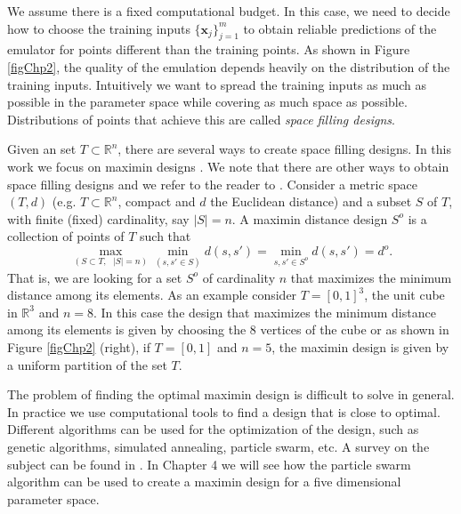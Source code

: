 \documentclass{sfuthesis}
\newcommand{\x}{\textbf{x}}
\begin{document}
We assume there is a fixed computational budget. In this case, we need to decide how
to choose the training inputs $\{\x_{j}\}_{j=1}^{m}$ to obtain reliable predictions 
of the emulator for points
different than the training points. As shown in Figure \ref{figChp2}, the quality
of the emulation depends heavily on the distribution of the training inputs. 
Intuitively we want to spread the training inputs as much as possible in the
parameter space while covering  as much space as possible. 
Distributions of points that achieve this are called \textit{space filling designs}.
 
Given an set $T\subset\mathbb{R}^{n}$, there are several ways to create space filling designs. 
In this work we focus on maximin designs
\cite{johnson1990minimax}. We note that there are other ways to obtain space filling
designs and we refer to the reader to  \cite{pronzato2012design}. Consider a metric space $(T,d)$ (e.g.
$T\subset\mathbb{R}^{n}$, compact and $d$ the Euclidean distance) and a subset $S$ of $T$, 
with finite (fixed) cardinality, say $|S|=n$.
A maximin distance design $S^{o}$ is a collection of points of $T$  such that
\begin{equation*}
\max_{(S\subset T,\text{ }|S|=n)}\min_{(s,s'\in S)}d(s,s')=\min_{s,s'\in S^{o}}d(s,s')=d^{o}.
\end{equation*}
That is, we are looking for a set $S^{o}$ of cardinality $n$ that maximizes the minimum distance among 
its elements. As an example consider $T=[0,1]^{3}$, the unit cube in $\mathbb{R}^{3}$ and $n=8$. In 
this case the design that maximizes the minimum distance among its elements is given by choosing
 the 8 vertices of the cube or as shown in Figure \ref{figChp2} (right), if $T=[0,1]$ and $n=5$, 
the maximin design is given by a uniform partition  of the set $T$.


The problem of finding
the optimal  maximin design is difficult to solve in general. In practice we use computational tools
to find a design that is close to optimal.  Different  algorithms can be used for the optimization
of the design, such as genetic algorithms, simulated annealing, particle swarm, etc. A survey
on the subject  can be found in 
\cite{viana2010algorithm}. In Chapter 4 we will see how  the particle swarm algorithm can be used to 
create a maximin design for a five dimensional parameter space.
\end{document}
